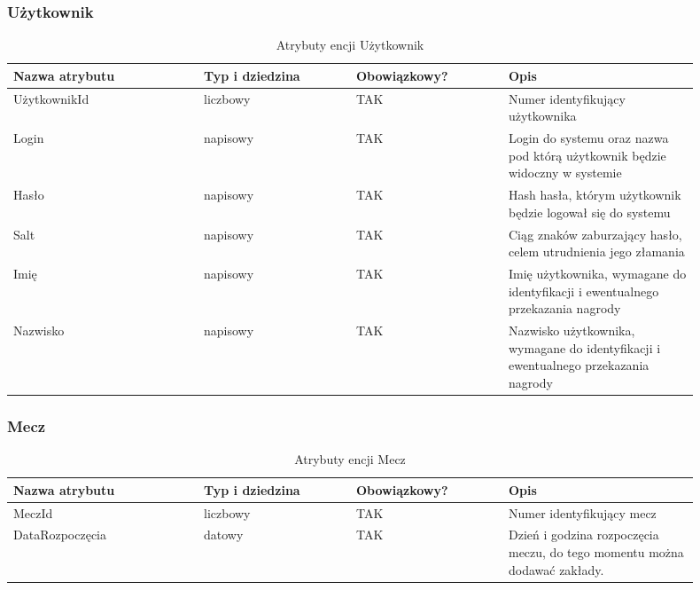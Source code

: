 \documentclass{mwrep}[15pt]
\begin{document}
\subsubsection{Użytkownik}
\begin{table}[H]
	\begin{tabular}{|p{0.25\linewidth}|p{0.2\linewidth}|p{0.2\linewidth}|p{0.25\linewidth}|}
	\hline
	Nazwa atrybutu & Typ i dziedzina & Obowiązkowy? & Opis                                                           \\ \hline
	UżytkownikId   & liczbowy                            & TAK                              & Numer identyfikujący użytkownika                                                   \\ \hline
	Login          & napisowy                            & TAK                              & Login do systemu oraz nazwa pod którą użytkownik będzie widoczny w systemie         \\ \hline
	Hasło          & napisowy                            & TAK                              & Hash hasła, którym użytkownik będzie logował się do systemu                        \\ \hline
	Salt           & napisowy                            & TAK                              & Ciąg znaków zaburzający hasło, celem utrudnienia jego złamania                     \\ \hline
	Imię           & napisowy                            & TAK                              & Imię użytkownika, wymagane do identyfikacji i ewentualnego przekazania nagrody     \\ \hline
	Nazwisko       & napisowy                            & TAK                              & Nazwisko użytkownika, wymagane do identyfikacji i ewentualnego przekazania nagrody \\ \hline
	\end{tabular}
	\caption{Atrybuty encji Użytkownik}
\end{table}

\subsubsection{Mecz}
\begin{table}[H]
	\begin{tabular}{|p{0.25\linewidth}|p{0.2\linewidth}|p{0.2\linewidth}|p{0.25\linewidth}|}
	\hline
	Nazwa atrybutu & Typ i dziedzina & Obowiązkowy? & Opis                                                           \\ \hline
	MeczId   & liczbowy                            & TAK                              & Numer identyfikujący mecz                                                  \\ \hline
	DataRozpoczęcia          & datowy                            & TAK                              & Dzień i godzina rozpoczęcia meczu, do tego momentu można dodawać zakłady.       \\ \hline
	\end{tabular}
	\caption{Atrybuty encji Mecz}
\end{table}
\end{document}
